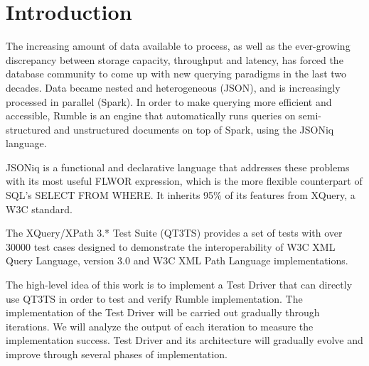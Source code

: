 
\chapter{Introduction}
\label{chapter:introduction}
The increasing amount of data available to process, as well as the ever-growing discrepancy between storage capacity, throughput and latency, has forced the database community to come up with new querying paradigms in the last two decades. Data became nested and heterogeneous (JSON), and is increasingly processed in parallel (Spark). In order to make querying more efficient and accessible, Rumble \cite{RumblePaper} is an engine that automatically runs queries on semi-structured and unstructured documents on top of Spark, using the JSONiq language. 

JSONiq \cite{JSONIQORG}is a functional and declarative language that addresses these problems with its most useful FLWOR expression, which is the more flexible counterpart of SQL’s SELECT FROM WHERE. It inherits 95\% of its features from XQuery, a W3C standard.

The XQuery/XPath 3.* Test Suite (QT3TS) \cite{TestSuite} provides a set of tests with over 30000 test cases designed to demonstrate the interoperability of W3C XML Query Language, version 3.0 and W3C XML Path Language implementations.

The high-level idea of this work is to implement a Test Driver that can directly use QT3TS in order to test and verify Rumble implementation. The implementation of the Test Driver will be carried out gradually through iterations. We will analyze the output of each iteration to measure the implementation success. Test Driver and its architecture will gradually evolve and improve through several phases of implementation. 

